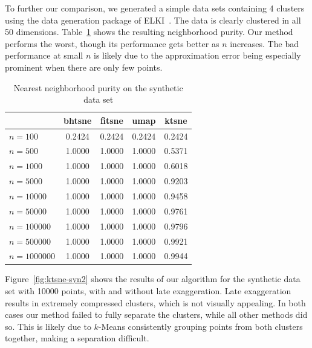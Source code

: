 To further our comparison, we generated a simple data sets containing 4 clusters using the data
generation package of ELKI~\cite{elki}. The data is clearly clustered in all 50 dimensions.
Table~\ref{tab:results-syn2} shows the resulting neighborhood purity. Our
method performs the worst, though its performance gets better as $n$ increases.
The bad performance at small $n$ is likely due to the approximation error being
especially prominent when there are only few points.

\begin{table}
  \centering
  \begin{tabular}{lcccc}
    \toprule
      & bhtsne & fitsne & umap & ktsne\\ \midrule
      $n = \num{100}$ & \num{0.2424} & \num{0.2424} & \num{0.2424} & \num{0.2424}\\
      $n = \num{500}$ & \num{1.0000} & \num{1.0000} & \num{1.0000} & \num{0.5371}\\
      $n = \num{1000}$ & \num{1.0000} & \num{1.0000} & \num{1.0000} & \num{0.6018}\\
      $n = \num{5000}$ & \num{1.0000} & \num{1.0000} & \num{1.0000} & \num{0.9203}\\
      $n = \num{10000}$ & \num{1.0000} & \num{1.0000} & \num{1.0000} & \num{0.9458}\\
      $n = \num{50000}$ & \num{1.0000} & \num{1.0000} & \num{1.0000} & \num{0.9761}\\
      $n = \num{100000}$ & \num{1.0000} & \num{1.0000} & \num{1.0000} & \num{0.9796}\\
      $n = \num{500000}$ & \num{1.0000} & \num{1.0000} & \num{1.0000} & \num{0.9921}\\
      $n = \num{1000000}$ & \num{1.0000} & \num{1.0000} & \num{1.0000} & \num{0.9944}\\
    \bottomrule
  \end{tabular}
  \caption{Nearest neighborhood purity on the synthetic data set}
  \label{tab:results-syn2}
\end{table}

Figure~\ref{fig:ktsne-syn2} shows the results of our algorithm for the synthetic data
set with \num{10000} points, with and without late exaggeration. Late exaggeration results
in extremely compressed clusters, which is not visually appealing. In both cases our
method failed to fully separate the clusters, while all other methods did so. This is
likely due to $k$-Means consistently grouping points from both clusters together, making
a separation difficult.

